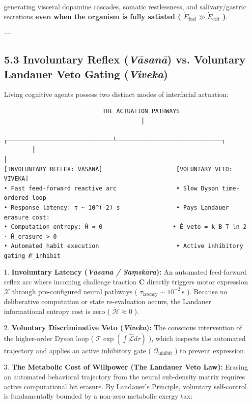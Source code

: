 \documentclass[11pt,a4paper]{article}
\theoremstyle{definition}
\theoremstyle{remark}
\begin{document}
generating visceral dopamine cascades, somatic restlessness, and salivary/gastric secretions \textbf{even when the organism is fully satiated ( $\dot{E}_{\text{fuel}} \gg \dot{E}_{\text{crit}}$ )}.

---

\subsection{5.3 Involuntary Reflex (\textit{Vāsanā}) vs. Voluntary Landauer Veto Gating (\textit{Viveka})}
Living cognitive agents possess two distinct modes of interfacial actuation:

\begin{verbatim}
                            THE ACTUATION PATHWAYS
                                       │
        ┌──────────────────────────────┴──────────────────────────────┐
        │                                                             │
[INVOLUNTARY REFLEX: VĀSANĀ]                     [VOLUNTARY VETO: VIVEKA]
• Fast feed-forward reactive arc                 • Slow Dyson time-ordered loop
• Response latency: τ ~ 10^(-2) s                • Pays Landauer erasure cost:
• Computation entropy: Ḣ ≈ 0                    • Ė_veto = k_B T ln 2 · Ḣ_erasure > 0
• Automated habit execution                      • Active inhibitory gating 𝓞_inhibit
\end{verbatim}

1. \textbf{Involuntary Latency (\textit{Vāsanā / Saṃskāra}):}
An automated feed-forward reflex arc where incoming challenge traction $\mathbf{C}$ directly triggers motor expression $\boldsymbol{\mathcal{X}}$ through pre-configured neural pathways ( $\tau_{\text{latency}} \sim 10^{-2}\,\mathrm{s}$ ). Because no deliberative computation or state re-evaluation occurs, the Landauer informational entropy cost is zero ( $\dot{\mathcal{H}} \approx 0$ ).

2. \textbf{Voluntary Discriminative Veto (\textit{Viveka}):}
The conscious intervention of the higher-order Dyson loop ( $\mathcal{T} \exp(\int \hat{\mathcal{L}} d\tau)$ ), which inspects the automated trajectory and applies an active inhibitory gate ( $\mathcal{O}_{\text{inhibit}}$ ) to prevent expression.

3. \textbf{The Metabolic Cost of Willpower (The Landauer Veto Law):}
Erasing an automated behavioral trajectory from the neural sub-density matrix requires active computational bit erasure. By Landauer's Principle, voluntary self-control is fundamentally bounded by a non-zero metabolic exergy tax:
\end{document}
